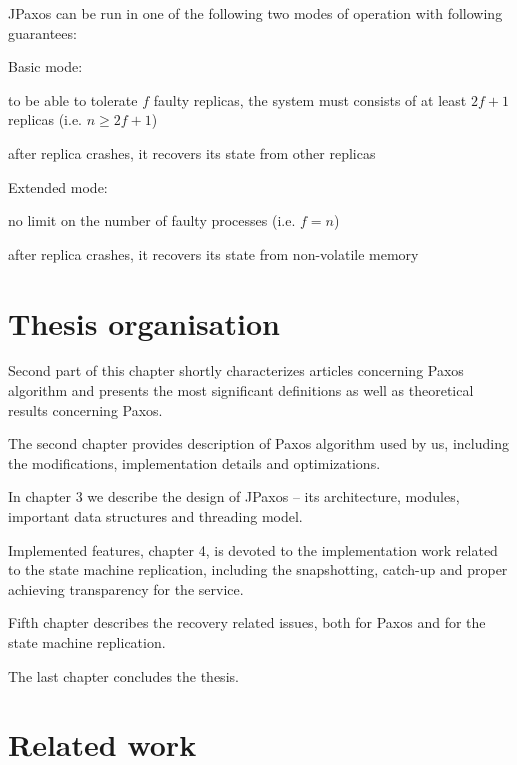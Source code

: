 JPaxos can be run in one of the following two modes of operation with following guarantees:\nopagebreak

Basic mode:
\begin{tightList}
  \item [\textbullet] to be able to tolerate $f$ faulty replicas, the system must consists of at least $2f + 1$ replicas (i.e. $n \ge 2f + 1$)
  \item [\textbullet] after replica crashes, it recovers its state from other replicas
\end{tightList}

Extended mode:
\begin{tightList}
  \item [\textbullet] no limit on the number of faulty processes (i.e. $f = n$)
  \item [\textbullet] after replica crashes, it recovers its state from non-volatile memory
\end{tightList}

\section{Thesis organisation}


Second part of this chapter %
shortly characterizes articles concerning Paxos algorithm and presents the most significant definitions as well as theoretical results concerning Paxos.

The second chapter provides description of Paxos algorithm used by us, including the modifications, implementation details and optimizations.

In chapter 3 we describe the design of JPaxos -- its architecture, modules, important data structures and threading model.

Implemented features, chapter 4, is devoted to the implementation work related to the state machine replication, including the snapshotting, catch-up and proper achieving transparency for the service.

Fifth chapter describes the recovery related issues, both for Paxos and for the state machine replication.

The last chapter concludes the thesis.

\section{Related work}

